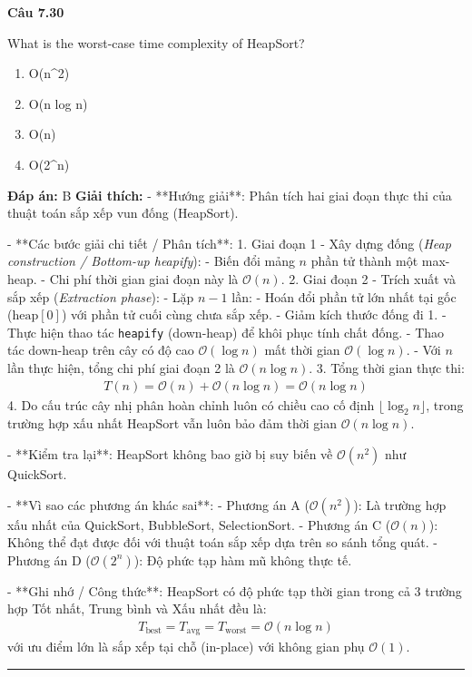 \documentclass[11pt,a4paper]{article}
\newenvironment{question}[1]{%
  \par\vspace{1em}\noindent\textbf{\large Câu #1}\par\vspace{0.4em}
}{%
  \par\vspace{1em}\hrule\vspace{0.6em}
}
\newenvironment{choices}{%
  \begin{enumerate}[label=\textbf{\Alph*.},leftmargin=2.2em,itemsep=2pt,topsep=3pt]
}{%
  \end{enumerate}
}
\newcommand{\choice}{\item}
\begin{document}
\begin{question}{7.30}
What is the worst-case time complexity of HeapSort?
\begin{choices}
\choice O(n^2)
\choice O(n log n)
\choice O(n)
\choice O(2^n)
\end{choices}
\textbf{Đáp án:} B
\textbf{Giải thích:} - **Hướng giải**:
Phân tích hai giai đoạn thực thi của thuật toán sắp xếp vun đống (HeapSort).


- **Các bước giải chi tiết / Phân tích**:
1. Giai đoạn 1 - Xây dựng đống (\textit{Heap construction / Bottom-up heapify}):
   - Biến đổi mảng \(n\) phần tử thành một max-heap.
   - Chi phí thời gian giai đoạn này là \(\mathcal{O}(n)\).
2. Giai đoạn 2 - Trích xuất và sắp xếp (\textit{Extraction phase}):
   - Lặp \(n - 1\) lần:
     - Hoán đổi phần tử lớn nhất tại gốc (\(\text{heap}[0]\)) với phần tử cuối cùng chưa sắp xếp.
     - Giảm kích thước đống đi 1.
     - Thực hiện thao tác \texttt{heapify} (down-heap) để khôi phục tính chất đống.
   - Thao tác down-heap trên cây có độ cao \(\mathcal{O}(\log n)\) mất thời gian \(\mathcal{O}(\log n)\).
   - Với \(n\) lần thực hiện, tổng chi phí giai đoạn 2 là \(\mathcal{O}(n \log n)\).
3. Tổng thời gian thực thi:
   \[\begin{aligned}
   T(n) = \mathcal{O}(n) + \mathcal{O}(n \log n) = \mathcal{O}(n \log n)
   \end{aligned}\]
4. Do cấu trúc cây nhị phân hoàn chỉnh luôn có chiều cao cố định \(\lfloor \log_2 n \rfloor\), trong trường hợp xấu nhất HeapSort vẫn luôn bảo đảm thời gian \(\mathcal{O}(n \log n)\).


- **Kiểm tra lại**:
HeapSort không bao giờ bị suy biến về \(\mathcal{O}(n^2)\) như QuickSort.


- **Vì sao các phương án khác sai**:
- Phương án A (\(\mathcal{O}(n^2)\)): Là trường hợp xấu nhất của QuickSort, BubbleSort, SelectionSort.
- Phương án C (\(\mathcal{O}(n)\)): Không thể đạt được đối với thuật toán sắp xếp dựa trên so sánh tổng quát.
- Phương án D (\(\mathcal{O}(2^n)\)): Độ phức tạp hàm mũ không thực tế.


- **Ghi nhớ / Công thức**:
HeapSort có độ phức tạp thời gian trong cả 3 trường hợp Tốt nhất, Trung bình và Xấu nhất đều là:
\[\begin{aligned}
T_{\text{best}} = T_{\text{avg}} = T_{\text{worst}} = \mathcal{O}(n \log n)
\end{aligned}\]
với ưu điểm lớn là sắp xếp tại chỗ (in-place) với không gian phụ \(\mathcal{O}(1)\).
\end{question}
\end{document}
